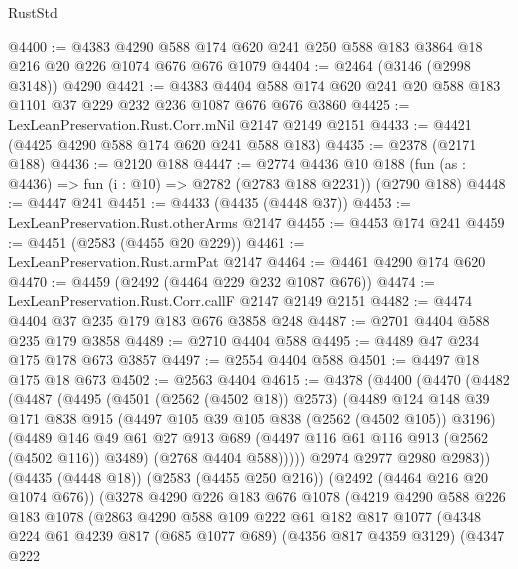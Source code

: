 \begin{lexlean}{RustStd}
\begin{coremodule}
@4400 := @4383
    @4290
    @588
    @174
    @620
    @241
    @250
    @588
    @183
    @3864
    @18
    @216
    @20
    @226
    @1074
    @676
    @676
    @1079
@4404 := @2464 (@3146 (@2998 @3148)) @4290
@4421 := @4383
    @4404
    @588
    @174
    @620
    @241
    @20
    @588
    @183
    @1101
    @37
    @229
    @232
    @236
    @1087
    @676
    @676
    @3860
@4425 := LexLeanPreservation.Rust.Corr.mNil @2147 @2149 @2151
@4433 := @4421 (@4425 @4290 @588 @174 @620 @241 @588 @183)
@4435 := @2378 (@2171 @188)
@4436 := @2120 @188
@4447 := @2774
    @4436
    @10
    @188
    (fun (as : @4436) => fun (i : @10) => @2782 (@2783 @188 @2231))
    (@2790 @188)
@4448 := @4447 @241
@4451 := @4433 (@4435 (@4448 @37))
@4453 := LexLeanPreservation.Rust.otherArms @2147
@4455 := @4453 @174 @241
@4459 := @4451 (@2583 (@4455 @20 @229))
@4461 := LexLeanPreservation.Rust.armPat @2147
@4464 := @4461 @4290 @174 @620
@4470 := @4459 (@2492 (@4464 @229 @232 @1087 @676))
@4474 := LexLeanPreservation.Rust.Corr.callF @2147 @2149 @2151
@4482 := @4474 @4404 @37 @235 @179 @183 @676 @3858 @248
@4487 := @2701 @4404 @588 @235 @179 @3858
@4489 := @2710 @4404 @588
@4495 := @4489 @47 @234 @175 @178 @673 @3857
@4497 := @2554 @4404 @588
@4501 := @4497 @18 @175 @18 @673
@4502 := @2563 @4404
@4615 := @4378
    (@4400
      (@4470
        (@4482
          (@4487
            (@4495
              (@4501 (@2562 (@4502 @18)) @2573)
              (@4489
                @124
                @148
                @39
                @171
                @838
                @915
                (@4497 @105 @39 @105 @838 (@2562 (@4502 @105)) @3196)
                (@4489
                  @146
                  @49
                  @61
                  @27
                  @913
                  @689
                  (@4497 @116 @61 @116 @913 (@2562 (@4502 @116)) @3489)
                  (@2768 @4404 @588)))))
          @2974
          @2977
          @2980
          @2983))
      (@4435 (@4448 @18))
      (@2583 (@4455 @250 @216))
      (@2492 (@4464 @216 @20 @1074 @676))
      (@3278
        @4290
        @226
        @183
        @676
        @1078
        (@4219
          @4290
          @588
          @226
          @183
          @1078
          (@2863
            @4290
            @588
            @109
            @222
            @61
            @182
            @817
            @1077
            (@4348
              @224
              @61
              @4239
              @817
              (@685 @1077 @689)
              (@4356 @817 @4359 @3129)
              (@4347
                @222

\end{coremodule}
\end{lexlean}

